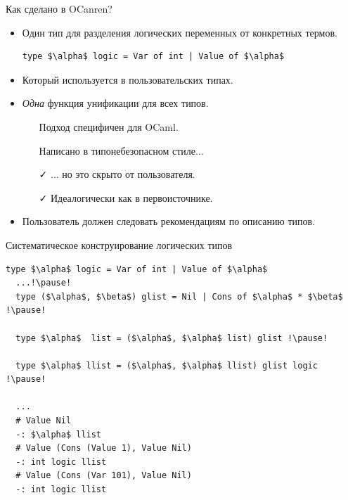 \documentclass[10pt, mathserif]{beamer}
\theoremstyle{definition}
\begin{document}
\begin{frame}[fragile]{Как сделано в OCanren?}

\begin{itemize}
 \item Один тип для разделения логических переменных от конкретных термов.
    \begin{lstlisting}[mathescape=true]
      type $\alpha$ logic = Var of int | Value of $\alpha$
    \end{lstlisting}
 \item Который используется в пользовательских типах.

 \pause
 \item \emph{Одна} функция унификации для всех типов.
    \vspace{1em}
    \begin{itemize}
    \item[\faTimes] Подход специфичен для OCaml.
    \item[\faTimes] Написано в типонебезопасном стиле...
    \item[\faCheck] ... но это скрыто от пользователя.
    \item[\faCheck] Идеалогически как в первоисточнике.
    \end{itemize}
  \pause
  \item Пользователь должен следовать рекомендациям по описанию типов.
\end{itemize}
\end{frame}

\begin{frame}[fragile]{Систематическое конструирование логических типов}
  \begin{lstlisting}[mathescape=true]
  type $\alpha$ logic = Var of int | Value of $\alpha$
  ...!\pause!
  type ($\alpha$, $\beta$) glist = Nil | Cons of $\alpha$ * $\beta$ !\pause!

  type $\alpha$  list = ($\alpha$, $\alpha$ list) glist !\pause!

  type $\alpha$ llist = ($\alpha$, $\alpha$ llist) glist logic !\pause!

  ...
  # Value Nil
  -: $\alpha$ llist
  # Value (Cons (Value 1), Value Nil)
  -: int logic llist
  # Value (Cons (Var 101), Value Nil)
  -: int logic llist
  \end{lstlisting}
\end{frame}
\end{document}
